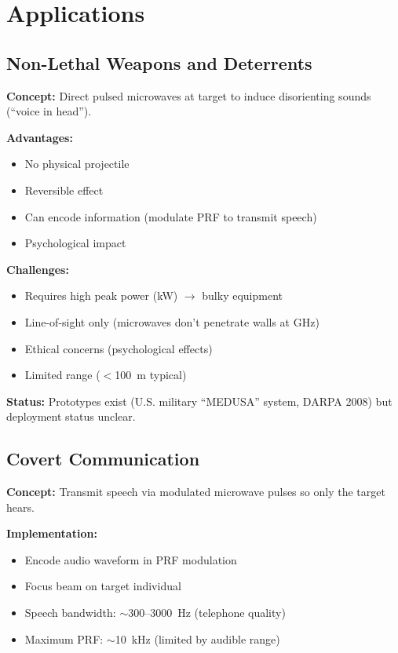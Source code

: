 \section{Applications}

\subsection{Non-Lethal Weapons and Deterrents}

\textbf{Concept:} Direct pulsed microwaves at target to induce disorienting sounds (``voice in head'').

\textbf{Advantages:}
\begin{itemize}
\item[\checkmark] No physical projectile
\item[\checkmark] Reversible effect
\item[\checkmark] Can encode information (modulate PRF to transmit speech)
\item[\checkmark] Psychological impact
\end{itemize}

\textbf{Challenges:}
\begin{itemize}
\item[\texttimes] Requires high peak power (kW) $\rightarrow$ bulky equipment
\item[\texttimes] Line-of-sight only (microwaves don't penetrate walls at GHz)
\item[\texttimes] Ethical concerns (psychological effects)
\item[\texttimes] Limited range ($<$100~m typical)
\end{itemize}

\textbf{Status:} Prototypes exist (U.S. military ``MEDUSA'' system, DARPA 2008) but deployment status unclear.

\subsection{Covert Communication}

\textbf{Concept:} Transmit speech via modulated microwave pulses so only the target hears.

\textbf{Implementation:}
\begin{itemize}
\item Encode audio waveform in PRF modulation
\item Focus beam on target individual
\item Speech bandwidth: $\sim$300--3000~Hz (telephone quality)
\item Maximum PRF: $\sim$10~kHz (limited by audible range)
\end{itemize}

